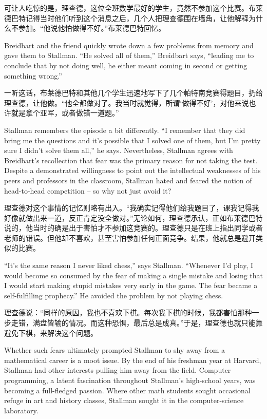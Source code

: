 \ifdefined\chs
可让人吃惊的是，理查德，这位全班数学最好的学生，竟然不参加这个比赛。布莱德巴特记得当时他们听到这个消息之后，几个人把理查德围在墙角，让他解释为什么不参加。“他说他怕做得不好。”布莱德巴特回忆。
\fi

\ifdefined\eng
Breidbart and the friend quickly wrote down a few problems from memory and gave them to Stallman. ``He solved all of them,'' Breidbart says, ``leading me to conclude that by not doing well, he either meant coming in second or getting something wrong.''
\fi

\ifdefined\chs
一听这话，布莱德巴特和其他几个学生迅速地写下了几个帕特南竞赛得题目，扔给理查德，让他做。“他全都做对了。我当时就觉得，所谓‘做得不好’，对他来说也许就是拿个亚军，或者做错一道题。”
\fi

\ifdefined\eng
Stallman remembers the episode a bit differently. ``I remember that they did bring me the questions and it's possible that I solved one of them, but I'm pretty sure I didn't solve them all,'' he says. Nevertheless, Stallman agrees with Breidbart's recollection that fear was the primary reason for not taking the test. Despite a demonstrated willingness to point out the intellectual weaknesses of his peers and professors in the classroom, Stallman hated and feared the notion of head-to-head competition -- so why not just avoid it?
\fi

\ifdefined\chs
理查德对这个事情的记忆则略有出入。“我确实记得他们给我题目了，课我记得我好像就做出来一道，反正肯定没全做对。”无论如何，理查德承认，正如布莱德巴特说的，他当时的确是出于害怕才不参加这竞赛的。理查德只是在班上指出同学或者老师的错误。但他却不喜欢，甚至害怕参加任何正面竞争。结果，他就总是避开类似的比赛。
\fi

\ifdefined\eng
``It's the same reason I never liked chess,'' says Stallman. ``Whenever I'd play, I would become so consumed by the fear of making a single mistake and losing that I would start making stupid mistakes very early in the game. The fear became a self-fulfilling prophecy.''  He avoided the problem by not playing chess.
\fi

\ifdefined\chs
理查德说：“同样的原因，我也不喜欢下棋。每次我下棋的时候，我都害怕那种一步走错，满盘皆输的情况。而这种恐惧，最后总是成真。”于是，理查德也就只能靠避免下棋，来解决这个问题。
\fi

\ifdefined\eng
Whether such fears ultimately prompted Stallman to shy away from a mathematical career is a moot issue. By the end of his freshman year at Harvard, Stallman had other interests pulling him away from the field. Computer programming, a latent fascination throughout Stallman's high-school years, was becoming a full-fledged passion. Where other math students sought occasional refuge in art and history classes, Stallman sought it in the computer-science laboratory.
\fi

